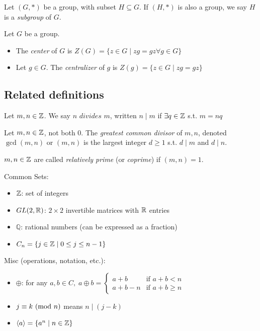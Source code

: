  Let $(G, \ast)$ be a group, with subset $H \subseteq G$. If $(H, \ast)$ is also a group, we say $H$ is a \textit{subgroup} of $G$.

 Let $G$ be a group. 
\begin{itemize}
    \item The \textit{center} of $G$ is $Z(G) = \{z \in G \mid zg = gz \forall g \in G\}$
    \item Let $g \in G$. The \textit{centralizer} of $g$ is $Z(g) = \{z \in G \mid zg = gz \}$
\end{itemize}

\subsection*{Related definitions}

 Let $m, n \in \mathbb{Z}$. We say $n \textit{ divides } m$, written $n \mid m$ if $\exists q \in \mathbb{Z}$ s.t. $m = nq$

 Let $m, n \in \mathbb{Z}$, not both $0$. The \textit{greatest common divisor} of $m, n$, denoted $\gcd(m, n)$ or $(m, n)$ is the largest integer $d \ge 1$ s.t. $d \mid m$ and $d \mid n$.

 $m, n \in \mathbb{Z}$ are called \textit{relatively prime} (or \textit{coprime}) if $(m, n) = 1$. 

\bigskip 

\noindent
Common Sets:
\begin{itemize}
    \item $\mathbb{Z}$: set of integers 
    \item $GL(2, \mathbb{R})$: $2 \times 2$ invertible matrices with $\mathbb{R}$ entries
    \item $\mathbb{Q}$: rational numbers (can be expressed as a fraction)
    \item $C_n = \{j \in \mathbb{Z} \mid 0 \le j \le n - 1 \}$
\end{itemize}

\bigskip

\noindent
Misc (operations, notation, etc.):
\begin{itemize}
    \item $\oplus$: for any $a, b \in C, \; a \oplus b = 
    \begin{cases}
        a + b & \text{if } a + b < n \\
        a + b - n & \text{if } a + b \ge n
    \end{cases}$
    \item $j \equiv k \text{ (mod } n)$ means $n \mid (j - k)$
    \item $\langle a \rangle = \{a^n \mid n \in \mathbb{Z}\}$
\end{itemize}

